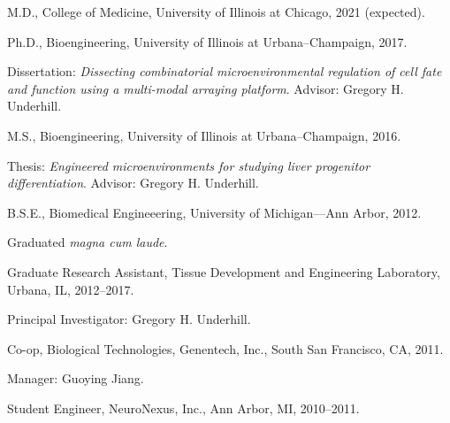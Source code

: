 \documentclass[11pt,article,oneside]{memoir}
\begin{document}
\medskip

\reversemarginpar

\bigskip


\ind M.D., College of Medicine, University of Illinois at Chicago, 2021 (expected).

\ind Ph.D., Bioengineering, University of Illinois at Urbana--Champaign, 2017.

\ind \hspace{0.35in} \footnotesize Dissertation: \emph{Dissecting combinatorial microenvironmental regulation of cell fate and function using a multi-modal arraying platform}. Advisor: Gregory H. Underhill. \normalsize\vspace{0.05in}

\ind M.S., Bioengineering, University of Illinois at Urbana--Champaign, 2016.

\ind \hspace{0.35in} \footnotesize Thesis: \emph{Engineered microenvironments for studying liver progenitor differentiation}. Advisor: Gregory H. Underhill.\normalsize\vspace{0.05in}

\ind B.S.E., Biomedical Engineeering, University of Michigan---Ann Arbor, 2012.

\ind \hspace{0.35in} \footnotesize Graduated \emph{magna cum laude}. \normalsize\vspace{0.05in}

\bigskip


\ind Graduate Research Assistant, Tissue Development and Engineering Laboratory, Urbana, IL, 2012--2017.

\ind \hspace{0.35in} \footnotesize Principal Investigator: Gregory H. Underhill.\normalsize\vspace{0.05in}
 
\ind Co-op, Biological Technologies, Genentech, Inc., South San Francisco, CA, 2011.

\ind \hspace{0.35in} \footnotesize Manager: Guoying Jiang.\normalsize\vspace{0.05in}
 
\ind Student Engineer, NeuroNexus, Inc., Ann Arbor, MI, 2010--2011.
\end{document}
